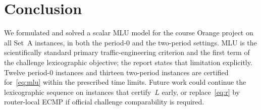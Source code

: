 \section{Conclusion}

We formulated and solved a scalar MLU model for the course Orange project on all Set~A
instances, in both the period-0 and the two-period settings.
MLU is the scientifically standard primary traffic-engineering criterion and the first term
of the challenge lexicographic objective; the report states that limitation explicitly.
Twelve period-0 instances and thirteen two-period instances are certified for~\eqref{eq:mlu}
within the prescribed time limits.
Future work could continue the lexicographic sequence on instances that certify~$L$ early,
or replace~\eqref{eq:r} by router-local ECMP if official challenge comparability is required.
